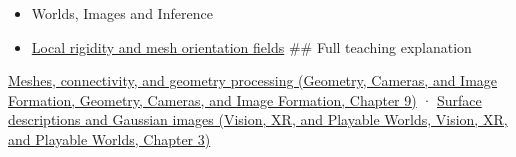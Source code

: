 \begin{itemize}
\item
  {Worlds, Images and Inference}
\item
  \hyperref[appendix-7107009c505b]{Local rigidity and mesh orientation fields} \#\# Full teaching explanation
\end{itemize}

\href{../03-Geometry-Cameras-and-Image-Formation/main.pdf\#nameddest=03-visual-computing-i-ch002-meshes-connectivity-and-geometry-processing}{Meshes, connectivity, and geometry processing (Geometry, Cameras, and Image Formation, Geometry, Cameras, and Image Formation, Chapter 9)} · \href{../07-Vision-XR-and-Playable-Worlds/main.pdf\#nameddest=04-visual-computing-ii-ch032-surface-descriptions-and-gaussian-images}{Surface descriptions and Gaussian images (Vision, XR, and Playable Worlds, Vision, XR, and Playable Worlds, Chapter 3)}
